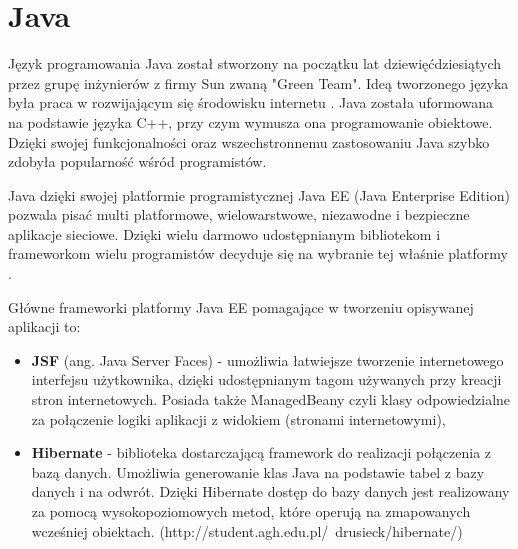 \section{Java}
\label{sec:java}

Język programowania Java został stworzony na początku lat dziewięćdziesiątych przez grupę inżynierów z firmy Sun zwaną "Green Team". Ideą tworzonego języka była praca w rozwijającym się środowisku internetu \cite{Java01}. Java została uformowana na podstawie języka C++, przy czym wymusza ona programowanie obiektowe. Dzięki swojej funkcjonalności oraz wszechstronnemu zastosowaniu Java szybko zdobyła popularność wśród programistów.

Java dzięki swojej platformie programistycznej Java EE (Java Enterprise Edition) pozwala pisać multi platformowe, wielowarstwowe, niezawodne i bezpieczne aplikacje sieciowe. Dzięki wielu darmowo udostępnianym bibliotekom i frameworkom wielu programistów decyduje się na wybranie tej właśnie platformy \cite{JEE01}. 

Główne frameworki platformy Java EE pomagające w tworzeniu opisywanej aplikacji to:
\begin{itemize}
	\item \textbf{JSF} (ang. Java Server Faces) - umożliwia łatwiejsze tworzenie internetowego interfejsu użytkownika, dzięki udostępnianym tagom używanych przy kreacji stron internetowych. Posiada także ManagedBeany czyli klasy odpowiedzialne za połączenie logiki aplikacji z widokiem (stronami internetowymi),
	\item \textbf{Hibernate} - biblioteka dostarczającą framework do realizacji połączenia z bazą danych. Umożliwia generowanie klas Java na podstawie tabel z bazy danych i na odwrót. Dzięki Hibernate dostęp do bazy danych jest realizowany za pomocą wysokopoziomowych metod, które operują na zmapowanych wcześniej obiektach. (http://student.agh.edu.pl/~drusieck/hibernate/)
\end{itemize}


